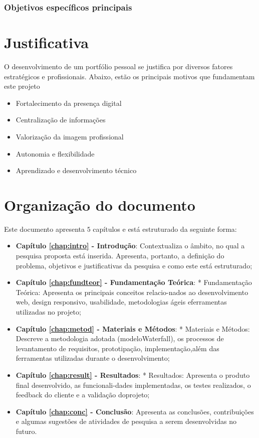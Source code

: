 \subsubsection*{Objetivos específicos principais}
\label{sssec:obj-principais}



\section{Justificativa}
\label{sec:justi}

O desenvolvimento de um portfólio pessoal se justifica por diversos fatores estratégicos e profissionais. Abaixo, estão os principais motivos que fundamentam este projeto 
\begin{itemize}
\item Fortalecimento da presença digital
\item Centralização de informações
\item Valorização da imagem profissional
\item Autonomia e flexibilidade
\item Aprendizado e desenvolvimento técnico
\end{itemize}
\section{Organização do documento}
\label{section:organizacao}

Este documento apresenta $5$ capítulos e está estruturado da seguinte forma:

\begin{itemize}

  \item \textbf{Capítulo \ref{chap:intro} - Introdução}: Contextualiza o âmbito, no qual a pesquisa proposta está inserida. Apresenta, portanto, a definição do problema, objetivos e justificativas da pesquisa e como este \thetypeworkthree está estruturado;
  \item \textbf{Capítulo \ref{chap:fundteor} - Fundamentação Teórica}: * Fundamentação Teórica: Apresenta os principais conceitos relacio-nados ao desenvolvimento web, design responsivo, usabilidade, metodologias ágeis eferramentas utilizadas no projeto;
  \item \textbf{Capítulo \ref{chap:metod} - Materiais e Métodos}: * Materiais e Métodos: Descreve a metodologia adotada (modeloWaterfall), os processos de levantamento de requisitos, prototipação, implementação,além das ferramentas utilizadas durante o desenvolvimento;
  \item \textbf{Capítulo \ref{chap:result} - Resultados}: * Resultados: Apresenta o produto final desenvolvido, as funcionali-dades implementadas, os testes realizados, o feedback do cliente e a validação doprojeto;
  \item \textbf{Capítulo \ref{chap:conc} - Conclusão}: Apresenta as conclusões, contribuições e algumas sugestões de atividades de pesquisa a serem desenvolvidas no futuro.

\end{itemize}
